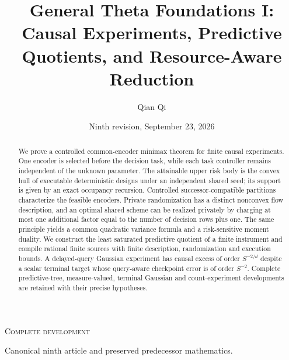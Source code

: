 
\newcommand{\Wone}{W_1}
\newcommand{\Del}{\Delta}
\newcommand{\emptyw}{\varnothing}
\newcommand{\osc}{\operatorname{osc}}
\newcommand{\diam}{\operatorname{diam}}
\newcommand{\Lipone}{\operatorname{Lip}_1}
\title[General Theta Foundations I]{General Theta Foundations I: Causal Experiments, Predictive Quotients, and Resource-Aware Reduction}
\author{Qian Qi}
\date{Ninth revision, September 23, 2026}

\begin{abstract}
We prove a controlled common-encoder minimax theorem for finite causal
experiments. One encoder is selected before the decision task, while each
task controller remains independent of the unknown parameter. The
attainable upper risk body is the convex hull of executable deterministic
designs under an independent shared seed; its support is given by an
exact occupancy recursion. Controlled successor-compatible partitions
characterize the feasible encoders. Private randomization has a distinct
nonconvex flow description, and an optimal shared scheme can be realized
privately by charging at most one additional factor equal to the number
of decision rows plus one. The same principle yields a common quadratic
variance formula and a risk-sensitive moment duality. We construct the
least saturated predictive quotient of a finite instrument and compile
rational finite sources with finite description, randomization and
execution bounds. A delayed-query Gaussian experiment has causal excess
of order $S^{-2/d}$ despite a scalar terminal target whose query-aware
checkpoint error is of order $S^{-2}$. Complete predictive-tree,
measure-valued, terminal Gaussian and count-experiment developments are
retained with their precise hypotheses.
\end{abstract}
\maketitle
\ifcomplete
\begin{center}\small\textsc{Complete development}\par
Canonical ninth article and preserved predecessor mathematics.
\end{center}
\fi
\tableofcontents
